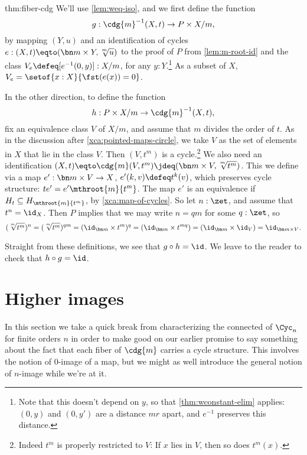\begin{implementation}{thm:fiber-cdg}
  We'll use \cref{lem:weq-iso}, and we first define the function
  \[
    g : \cdg{m}^{-1}(X,t) \to P\times X/m,
  \]
  by mapping $(Y,u)$ and an identification of cycles
  $e : (X,t) \eqto (\bn m\times Y,\sqrt[\uproot{2}m]{u})$
  to the proof of $P$ from \cref{lem:m-root-id}
  and the class $V_e\defeq [e^{-1}(0,y)]:X/m$, for any $y:Y$.\footnote{%
  Note that this doesn't depend on $y$, so that \cref{thm:wconstant-elim}
  applies: $(0,y)$ and $(0,y')$ are a distance $mr$ apart,
  and $e^{-1}$ preserves this distance.}
  As a subset of $X$, $V_e=\setof{x:X}{\fst(e(x))=0}$.

  In the other direction, to define the function
  \[
    h : P\times X/m \to \cdg{m}^{-1}(X,t),
  \]
  fix an equivalence class $V$ of $X/m$,
  and assume that $m$ divides the order of $t$.
  As in the discussion after \cref{xca:pointed-maps-circle},
  we take $V$ as the set of elements in $X$ that lie in the class $V$.
  Then $(V,t^m)$ is a cycle.\footnote{%
  Indeed $t^m$ is properly restricted to $V$: If $x$ lies in $V$,
  then so does $t^m(x)$.}
  We also need an identification
  $(X,t)\eqto\cdg{m}(V,t^m)\jdeq(\bn m\times V,\sqrt[\uproot{2}m]{t^m})$.
  This we define via a map $e' : \bn m\times V \to X$, $e'(k,v) \defeq t^k(v)$,
  which preserves cycle structure: $te'= e'\mthroot{m}{t^m}$.
  The map $e'$ is an equivalence if $H_t \subseteq H_{\mthroot{m}{t^m}}$,
  by \cref{xca:map-of-cycles}.
  So let $n:\zet$, and assume that $t^n=\id_X$.
  Then $P$ implies that we may write $n=qm$ for some $q:\zet$,
  so
  \[
    (\sqrt[\uproot{2}m]{t^m})^n
    = (\sqrt[\uproot{2}m]{t^m})^{qm}
    = (\id_{\bn m} \times t^m)^q = (\id_{\bn m} \times t^{mq})
    = (\id_{\bn m} \times \id_V)= \id_{\bn m \times V}.
  \]

  Straight from these definitions, we see that $g\circ h=\id$.
  We leave to the reader to check that $h\circ g=\id$.
\end{implementation}

\section{Higher images}
\label{sec:higher-images}

In this section we take a quick break from characterizing the connected \coverings
of $\Cyc_n$ for finite orders $n$ in order to make good on our earlier promise
to say something about the fact that each fiber of $\cdg{m}$
carries a cycle structure.
This involves the notion of $0$-image of a map, but we might as well
introduce the general notion of $n$-image while we're at it.

